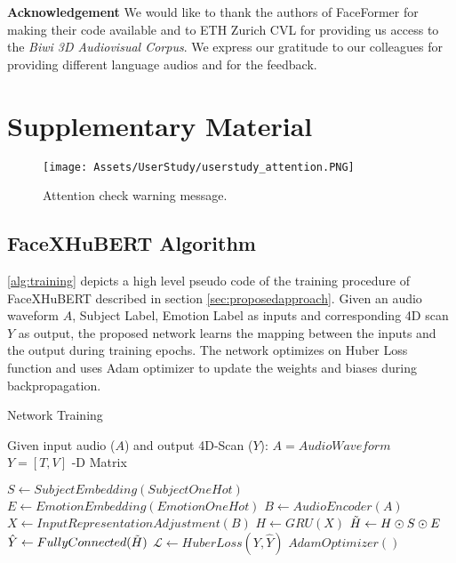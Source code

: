 \documentclass[10pt,twocolumn,letterpaper]{article}
\begin{document}
\noindent\textbf{Acknowledgement} We would like to thank the authors of FaceFormer for making their code available and to ETH Zurich CVL for providing us access to the \textit{Biwi 3D Audiovisual Corpus}. We express our gratitude to our colleagues for providing different language audios and for the feedback.



{\small


}

\clearpage
\appendix
\section{Supplementary Material}

\begin{figure*}[]
  \centering
  \texttt{[image: Assets/UserStudy/userstudy\_attention.PNG]}
  \caption{Attention check warning message.}
  \label{fig:userstudyscreen3}
\end{figure*}
\subsection{FaceXHuBERT Algorithm}
\cref{alg:training} depicts a high level pseudo code of the training procedure of FaceXHuBERT described in section \cref{sec:proposedapproach}. Given an audio waveform $A$, Subject Label, Emotion Label as inputs and corresponding 4D scan $Y$ as output, the proposed network learns the mapping between the inputs and the output during training epochs. The network optimizes on Huber Loss function and uses Adam optimizer to update the weights and biases during backpropagation. 

\begin{algorithm}

\caption{Network Training}\label{alg:training}
\begin{algorithmic}
\State Given input audio ($A$) and output 4D-Scan ($Y$):
\State $A = AudioWaveform$ 
\State $Y = [T,V]$ \space -D Matrix  
\newline

\State $S \gets SubjectEmbedding(SubjectOneHot)$
\State $E \gets EmotionEmbedding(EmotionOneHot)$
\State $B \gets AudioEncoder(A)$
\State $X \gets InputRepresentationAdjustment(B)$
\State $H \gets GRU(X)$
\State $\Tilde{H} \gets H \odot S \odot E$
\State $\hat{Y} \gets FullyConnected(\Tilde{H})$
\State $\mathcal{L} \gets HuberLoss(Y, \hat{Y})$
\State $AdamOptimizer()$

\end{algorithmic}
\end{algorithm}
\end{document}
